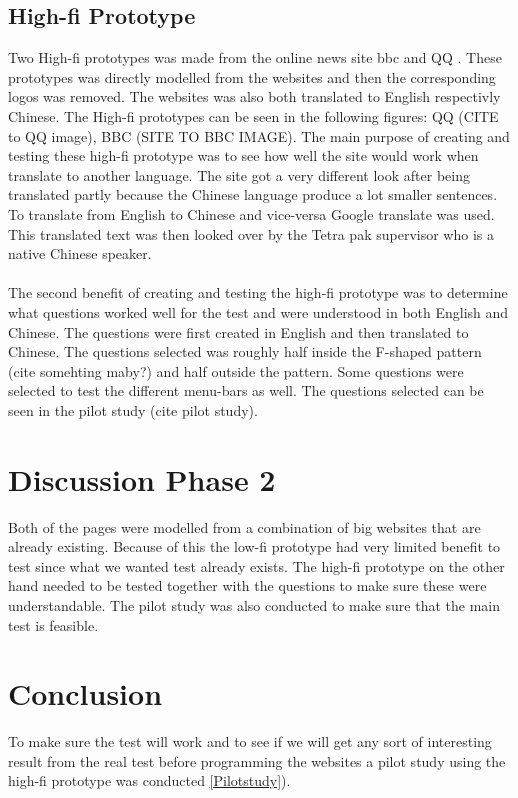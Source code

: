 \subsection{High-fi Prototype}
Two High-fi prototypes was made from the online news site bbc \cite{bbc} and QQ \cite{qq_homepage}. These prototypes was directly modelled from the websites and then the corresponding logos was removed. The websites was also both translated to English respectivly Chinese. The High-fi prototypes can be seen in the following figures: QQ (CITE to QQ image), BBC (SITE TO BBC IMAGE). The main purpose of creating and testing these high-fi prototype was to see how well the site would work when translate to another language. The site got a very different look after being translated partly because the Chinese language produce a lot smaller sentences. To translate from English to Chinese and vice-versa Google translate was used. This translated text was then looked over by the Tetra pak supervisor who is a native Chinese speaker. 
\\\\
The second benefit of creating and testing the high-fi prototype was to determine what questions worked well for the test and were understood in both English and Chinese. The questions were first created in English and then translated to Chinese. The questions selected was roughly half inside the F-shaped pattern (cite somehting maby?) and half outside the pattern. Some questions were selected to test the different menu-bars as well. The questions selected can be seen in the pilot study (cite pilot study).


\section{Discussion Phase 2}
Both of the pages were modelled from a combination of big websites that are already existing. Because of this the low-fi prototype had very limited benefit to test since what we wanted test already exists. The high-fi prototype on the other hand needed to be tested together with the questions to make sure these were understandable. The pilot study was also conducted to make sure that the main test is feasible. 

\section{Conclusion}
To make sure the test will work and to see if we will get any sort of interesting result from the real test before programming the websites a pilot study using the high-fi prototype was conducted \ref{Pilotstudy}).



